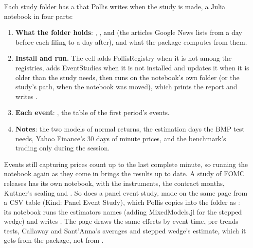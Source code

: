 Each study folder has a  that Pollis writes when the study is made, a Julia notebook in four parts:
\begin{enumerate}
  \item \textbf{What the folder holds}: , ,  and  (the articles
    Google News lists from a day before each filing to a day after), and what the package computes from them.
  \item \textbf{Install and run.} The cell adds PollisRegistry when it is not among the registries, adds
    EventStudies when it is not installed and updates it when it is older than the study needs, then runs
     on the notebook's own folder (or the study's path, when the notebook was moved), which prints the
    report and writes .
  \item \textbf{Each event}: , the table of the first period's events.
  \item \textbf{Notes}: the two models of normal returns, the estimation days the BMP test needs, Yahoo Finance's 30
    days of minute prices, and the benchmark's trading only during the session.
\end{enumerate}
Events still capturing prices count up to the last complete minute, so running the notebook again as they come in
brings the results up to date. A study of FOMC releases has its own notebook, with the instruments, the contract
months, Kuttner's scaling and . So does a panel event study, made on the same page from a CSV
table (Kind: Panel Event Study), which Pollis copies into the folder as : its notebook runs the estimators
 names (adding MixedModels.jl for the stepped wedge) and writes . The page draws the same
effects by event time, pre-trends tests, Callaway and Sant'Anna's averages and stepped wedge's estimate, which it gets
from the package, not from .

